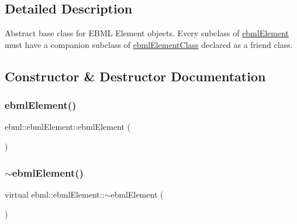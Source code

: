 \subsection{Detailed Description}
Abstract base class for E\+B\+ML Element objects. Every subclass of \mbox{\hyperlink{classebml_1_1ebmlElement}{ebml\+Element}} must have a companion subclass of \mbox{\hyperlink{classebml_1_1ebmlElementClass}{ebml\+Element\+Class}} declared as a friend class. 

\subsection{Constructor \& Destructor Documentation}
\mbox{\label{classebml_1_1ebmlElement_ab7e661b76def75bcfb8cd55224ae2ce5}} 
\subsubsection{\texorpdfstring{ebml\+Element()}{ebmlElement()}}
{\footnotesize\ttfamily ebml\+::ebml\+Element\+::ebml\+Element (\begin{DoxyParamCaption}\item[{const \mbox{\hyperlink{classebml_1_1ebmlElementClass}{ebml\+Element\+Class}} $\ast$}]{ }\end{DoxyParamCaption})\hspace{0.3cm}{\ttfamily [protected]}}

\mbox{\label{classebml_1_1ebmlElement_a2098d59a92f38d5ab5dbad0c7611115a}} 
\subsubsection{\texorpdfstring{$\sim$ebml\+Element()}{~ebmlElement()}}
{\footnotesize\ttfamily virtual ebml\+::ebml\+Element\+::$\sim$ebml\+Element (\begin{DoxyParamCaption}{ }\end{DoxyParamCaption})\hspace{0.3cm}{\ttfamily [virtual]}}



